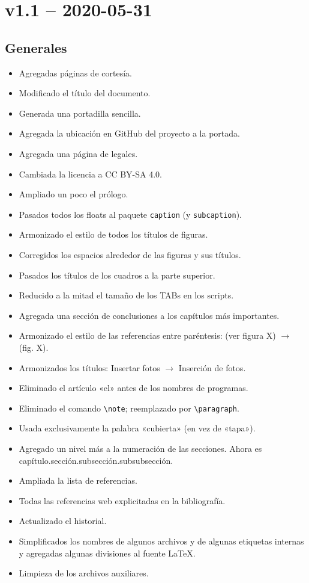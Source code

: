 \documentclass[%
	a5paper,
	10pt,
	twoside,
	openright,
	final,
]{memoir}
\begin{document}
{	\section{v1.1 -- 2020-05-31}
	\subsection{Generales}
	\begin{itemize}[noitemsep]
		\item Agregadas páginas de cortesía.
		\item Modificado el título del documento.
		\item Generada una portadilla sencilla.
		\item Agregada la ubicación en GitHub del proyecto a la portada.
		\item Agregada una página de legales.
		\item Cambiada la licencia a CC BY-SA 4.0.
		\item Ampliado un poco el prólogo.
		\item Pasados todos los floats al paquete \texttt{caption} (y \texttt{subcaption}).
		\item Armonizado el estilo de todos los títulos de figuras.
		\item Corregidos los espacios alrededor de las figuras y sus títulos.
		\item Pasados los títulos de los cuadros a la parte superior.
		\item Reducido a la mitad el tamaño de los TABs en los scripts.
		\item Agregada una sección de conclusiones a los capítulos más importantes.
		\item Armonizado el estilo de las referencias entre paréntesis: (ver figura X) $\rightarrow$ (fig. X).
		\item Armonizados los títulos: Insertar fotos $\rightarrow$ Inserción de fotos.
		\item Eliminado el artículo «el» antes de los nombres de programas.
		\item Eliminado el comando \texttt{\textbackslash note}; reemplazado por \texttt{\textbackslash paragraph}.
		\item Usada exclusivamente la palabra «cubierta» (en vez de «tapa»).
		\item Agregado un nivel más a la numeración de las secciones. Ahora es capítulo.sección.subsección.subsubsección.
		\item Ampliada la lista de referencias.
		\item Todas las referencias web explicitadas en la bibliografía.
		\item Actualizado el historial.
		\item Simplificados los nombres de algunos archivos y de algunas etiquetas internas y agregadas algunas divisiones al fuente \LaTeX.
		\item Limpieza de los archivos auxiliares.
	\end{itemize}

}
\end{document}
